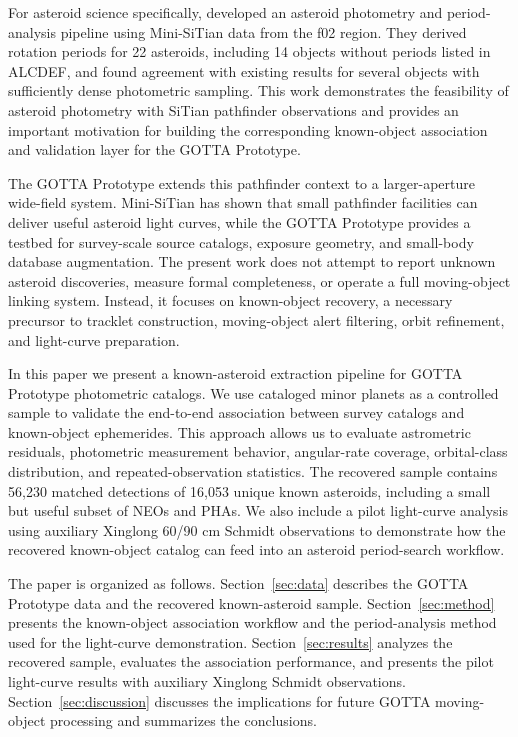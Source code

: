 \documentclass[referee]{raa}
\begin{document}
For asteroid science specifically, \citet{LiuZhaoxing2025AsteroidLC} developed an asteroid photometry and period-analysis pipeline using Mini-SiTian data from the f02 region. They derived rotation periods for 22 asteroids, including 14 objects without periods listed in ALCDEF, and found agreement with existing results for several objects with sufficiently dense photometric sampling. This work demonstrates the feasibility of asteroid photometry with SiTian pathfinder observations and provides an important motivation for building the corresponding known-object association and validation layer for the GOTTA Prototype.

The GOTTA Prototype extends this pathfinder context to a larger-aperture wide-field system. Mini-SiTian has shown that small pathfinder facilities can deliver useful asteroid light curves, while the GOTTA Prototype provides a testbed for survey-scale source catalogs, exposure geometry, and small-body database augmentation. The present work does not attempt to report unknown asteroid discoveries, measure formal completeness, or operate a full moving-object linking system. Instead, it focuses on known-object recovery, a necessary precursor to tracklet construction, moving-object alert filtering, orbit refinement, and light-curve preparation.

In this paper we present a known-asteroid extraction pipeline for GOTTA Prototype photometric catalogs. We use cataloged minor planets as a controlled sample to validate the end-to-end association between survey catalogs and known-object ephemerides. This approach allows us to evaluate astrometric residuals, photometric measurement behavior, angular-rate coverage, orbital-class distribution, and repeated-observation statistics. The recovered sample contains 56,230 matched detections of 16,053 unique known asteroids, including a small but useful subset of NEOs and PHAs. We also include a pilot light-curve analysis using auxiliary Xinglong 60/90 cm Schmidt observations to demonstrate how the recovered known-object catalog can feed into an asteroid period-search workflow.

The paper is organized as follows. Section~\ref{sec:data} describes the GOTTA Prototype data and the recovered known-asteroid sample. Section~\ref{sec:method} presents the known-object association workflow and the period-analysis method used for the light-curve demonstration. Section~\ref{sec:results} analyzes the recovered sample, evaluates the association performance, and presents the pilot light-curve results with auxiliary Xinglong Schmidt observations. Section~\ref{sec:discussion} discusses the implications for future GOTTA moving-object processing and summarizes the conclusions.
\end{document}
